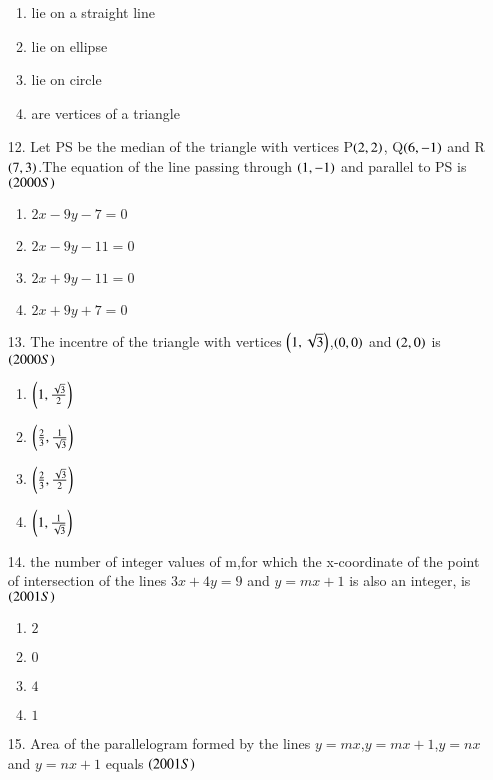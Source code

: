\documentclass[journal,12pt,onecolumn]{IEEEtran}
\theoremstyle{remark}
\begin{document}
\begin{enumerate}
\begin{enumerate}
        \item lie on a straight line
        \item lie on ellipse
        \item lie on circle
        \item are vertices of a triangle 
    
\end{enumerate}
\item[12.] Let PS be the median of the triangle with vertices P$\left(2,2\right)$, Q$\left(6,-1\right)$ and R$\left(7,3\right)$.The equation of the line passing through $\left(1,-1\right)$ and parallel to PS is 
\hfill{$\left(2000S\right)$}
\begin{enumerate}

      \item $2x-9y-7=0$  
      \item $2x-9y-11=0$
      \item $2x+9y-11=0$
      \item $2x+9y+7=0$

\end{enumerate}
\item[13.] The incentre of the triangle with vertices $\left(1,\sqrt{3}\right)$,$\left(0,0\right)$ and $\left(2,0\right)$ is 
\hfill{$\left(2000S\right)$}
\begin{enumerate}
    
     \item $\left(1,\frac{\sqrt{3}}{2}\right)$
     \item $\left(\frac{2}{3},\frac{1}{\sqrt{3}}\right)$
     \item $\left(\frac{2}{3},\frac{\sqrt{3}}{2}\right)$
     \item $\left(1,\frac{1}{\sqrt{3}}\right)$
    
\end{enumerate}
\item[14.] the number of integer values of m,for which the x-coordinate of the point of intersection of the lines $3x+4y=9$ and $y=mx+1$ is also an integer, is 
\hfill{$\left(2001S\right)$}
\begin{enumerate}
    
    \item $2$
    \item $0$
     \item $4$
     \item $1$
    
\end{enumerate}
\item[15.] Area of the parallelogram formed by the lines $y=mx$,$y=mx+1$,$y=nx$ and $y=nx+1$ equals
\hfill{$\left(2001S\right)$}
\begin{enumerate}
    

\end{enumerate}
\end{enumerate}
\end{document}
